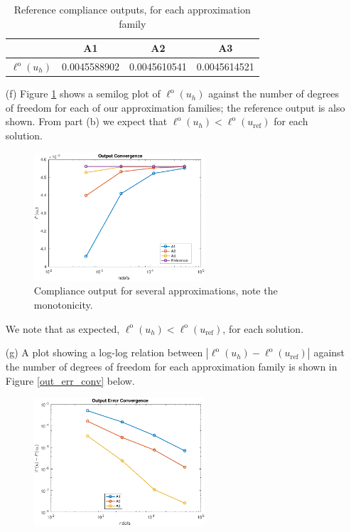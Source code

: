 \documentclass{article}
\begin{document}
\begin{itemize}
			   \begin{table}[H]
			   	\centering
			   	\begin{tabular}{r||c|c|c}
			   		& A1 & A2 & A3 \\
			   		\hline
			   		\(\ell^\text{o}(u_h)\) & 0.0045588902 & 0.0045610541 & 0.0045614521\\
			   	\end{tabular}
			   	\caption{Reference compliance outputs, for each approximation family}
			   	\label{table1}
			   \end{table}
	\item[(f)] Figure \ref{out_conv} shows a semilog plot of \(\ell^\text{o}(u_h) \) against the number of degrees of freedom for each of our approximation families; the reference output is also shown. From part (b) we expect that \(\ell^\text{o}(u_h) < \ell^\text{o}(u_\text{ref})\) for each solution. 
	\begin{figure}[H]
		\centering
		\includegraphics[width=0.6\textwidth]{Plate_output_conv.pdf}
		\caption{Compliance output for several approximations, note the monotonicity.}
		\label{out_conv}
	\end{figure}
	We note that as expected, \(\ell^\text{o}(u_h) < \ell^\text{o}(u_\text{ref})\), for each solution. 
	\item[(g)] A plot showing a log-log relation between \(|\ell^\text{o}(u_h) - \ell^\text{o}(u_\text{ref})| \) against the number of degrees of freedom for each approximation family is shown in Figure \ref{out_err_conv} below. 
	\begin{figure}[H]
		\centering
		\includegraphics[width=0.6\textwidth]{Plate_output_error_conv.pdf}

\end{figure}
\end{itemize}
\end{document}
